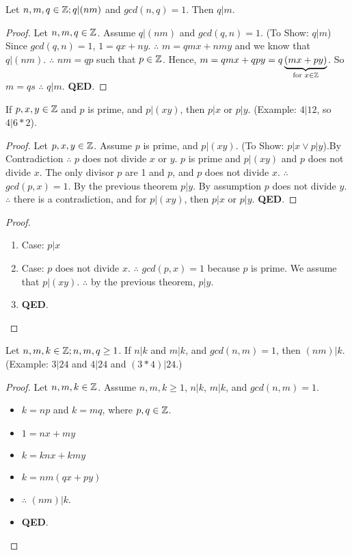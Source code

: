 \begin{theorem}[Textbook 2.4.6]
Let $n,m,q\in\mathbb{Z}; q|(nm)$ and $gcd(n,q)=1$. Then $q|m$.
\end{theorem}
\begin{proof}
Let $n,m,q\in\mathbb{Z}$. Assume $q|(nm)$ and $gcd(q,n)=1$. (To Show: $q|m$) Since $gcd(q,n)=1$, $1=qx+ny$. $\therefore$ $m=qmx+nmy$ and we know that $q|(nm)$. $\therefore$ $nm=qp$ such that $p\in\mathbb{Z}$. Hence, $m=qmx+qpy=q\underbrace{(mx+py)}_{\text{for }x\in\mathbb{Z}}$. So $m=qs$ $\therefore$ $q|m$. \textbf{QED}.
\end{proof}
\begin{theorem}[Corollary 2.5.2]
If $p,x,y\in\mathbb{Z}$ and $p$ is prime, and $p|(xy)$, then $p|x$ or $p|y$. (Example: $4|12$, so $4|6*2$).
\end{theorem}
\begin{proof}
Let $p,x,y\in\mathbb{Z}$. Assume $p$ is prime, and $p|(xy)$. (To Show: $p|x \vee p|y$).By Contradiction $\therefore$ $p$ does not divide $x$ or $y$. $p$ is prime and $p|(xy)$ and $p$ does not divide $x$. The only divisor $p$ are 1 and $p$, and $p$ does not divide $x$. $\therefore$ $gcd(p,x)=1$. By the previous theorem $p|y$. By assumption $p$ does not divide $y$. $\therefore$ there is a contradiction, and for  $p|(xy)$, then $p|x$ or $p|y$. \textbf{QED}.
\end{proof}
\begin{proof}
\begin{enumerate}Same as above.
\item Case: $p|x$ \checkmark
\item Case: $p$ does not divide $x$. $\therefore$ $gcd(p,x)=1$ because $p$ is prime. We assume that $p|(xy)$. $\therefore$ by the previous theorem, $p|y$. \checkmark
\item \textbf{QED}.
\end{enumerate}
\end{proof}
\begin{theorem}
Let $n,m,k\in\mathbb{Z};n,m,q \ge 1$. If $n|k$ and $m|k$, and $gcd(n,m)=1$, then $(nm)|k$. (Example: $3|24$ and $4|24$ and $(3*4)|24$.)
\end{theorem}

\begin{proof}
Let $n,m,k\in\mathbb{Z}$. Assume $n,m,k \ge 1$, $n|k$, $m|k$, and $gcd(n,m)=1$. 
\begin{itemize}
\item $k=np$ and $k=mq$, where $p,q\in\mathbb{Z}$.
\item $1=nx+my$
\item $k=knx+kmy$
\item $k=nm(qx+py)$
\item $\therefore$ $(nm)|k$.
\item \textbf{QED}.
\end{itemize}
\end{proof}


